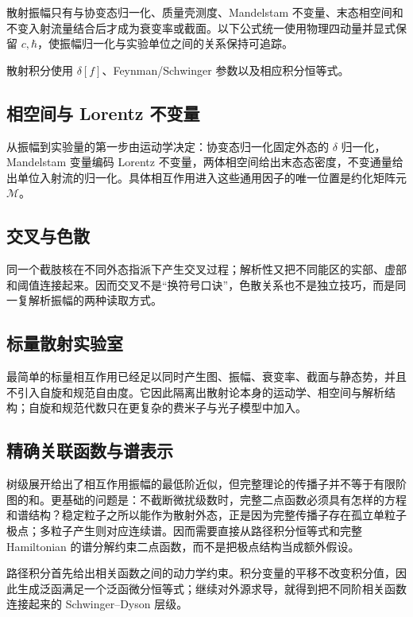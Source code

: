 散射振幅只有与协变态归一化、质量壳测度、Mandelstam 不变量、末态相空间和不变入射流量结合后才成为衰变率或截面。以下公式统一使用物理四动量并显式保留 $c,\hbar$，使振幅归一化与实验单位之间的关系保持可追踪。

散射积分使用 $\delta[f]$、Feynman/Schwinger 参数以及相应积分恒等式。

\subsection{相空间与 Lorentz 不变量}
从振幅到实验量的第一步由运动学决定：协变态归一化固定外态的 $\delta$ 归一化，Mandelstam 变量编码 Lorentz 不变量，两体相空间给出末态态密度，不变通量给出单位入射流的归一化。具体相互作用进入这些通用因子的唯一位置是约化矩阵元 $\mathcal M$。



\subsection{交叉与色散}
同一个截肢核在不同外态指派下产生交叉过程；解析性又把不同能区的实部、虚部和阈值连接起来。因而交叉不是“换符号口诀”，色散关系也不是独立技巧，而是同一复解析振幅的两种读取方式。


\subsection{标量散射实验室}
最简单的标量相互作用已经足以同时产生图、振幅、衰变率、截面与静态势，并且不引入自旋和规范自由度。它因此隔离出散射论本身的运动学、相空间与解析结构；自旋和规范代数只在更复杂的费米子与光子模型中加入。



\subsection{精确关联函数与谱表示}\label{subsec:exact-correlators-spectral}

树级展开给出了相互作用振幅的最低阶近似，但完整理论的传播子并不等于有限阶图的和。更基础的问题是：不截断微扰级数时，完整二点函数必须具有怎样的方程和谱结构？稳定粒子之所以能作为散射外态，正是因为完整传播子存在孤立单粒子极点；多粒子产生则对应连续谱。因而需要直接从路径积分恒等式和完整 Hamiltonian 的谱分解约束二点函数，而不是把极点结构当成额外假设。

路径积分首先给出相关函数之间的动力学约束。积分变量的平移不改变积分值，因此生成泛函满足一个泛函微分恒等式；继续对外源求导，就得到把不同阶相关函数连接起来的 Schwinger--Dyson 层级。

